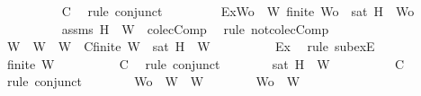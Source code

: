 \begin{isabellebody}
\ \ \ \ \ \ \ \ \isamarkupfalse%
\ C\ \isamarkupfalse%
\ {\isacharparenleft}rule\ conjunct{}{\isacharparenright}\ \isanewline
\ \ \ \ \ \ \isamarkupfalse%
\ Ex{}{\isacharcolon}{\isachardoublequoteopen}{\isasymexists}Wo\ {\isasymsubseteq}\ W{\isachardot}\ finite\ Wo\ {\isasymand}\ {\isasymnot}{\isacharparenleft}sat\ {\isacharparenleft}{\isacharbraceleft}H{\isacharbraceright}\ {\isasymunion}\ Wo{\isacharparenright}{\isacharparenright}{\isachardoublequoteclose}\isanewline
\ \ \ \ \ \ \ \ \isamarkupfalse%
\ assms\ {\isacartoucheopen}{\isacharbraceleft}H{\isacharbraceright}\ {\isasymunion}\ W\ {\isasymnotin}\ colecComp{\isacartoucheclose}\ \isamarkupfalse%
\ {\isacharparenleft}rule\ not{\isacharunderscore}colecComp{\isacharparenright}\isanewline
\ \ \ \ \ \ \isamarkupfalse%
\ W{}\ \ {\isachardoublequoteopen}W{}\ {\isasymsubseteq}\ W{\isachardoublequoteclose}\ \ C{}{\isacharcolon}{\isachardoublequoteopen}finite\ W{}\ {\isasymand}\ {\isasymnot}{\isacharparenleft}sat\ {\isacharparenleft}{\isacharbraceleft}H{\isacharbraceright}\ {\isasymunion}\ W{}{\isacharparenright}{\isacharparenright}{\isachardoublequoteclose}\isanewline
\ \ \ \ \ \ \ \ \isamarkupfalse%
\ Ex{}\ \isamarkupfalse%
\ {\isacharparenleft}rule\ subexE{\isacharparenright}\isanewline
\ \ \ \ \ \ \isamarkupfalse%
\ {\isachardoublequoteopen}finite\ W{}{\isachardoublequoteclose}\isanewline
\ \ \ \ \ \ \ \ \isamarkupfalse%
\ C{}\ \isamarkupfalse%
\ {\isacharparenleft}rule\ conjunct{}{\isacharparenright}\isanewline
\ \ \ \ \ \ \isamarkupfalse%
\ {\isachardoublequoteopen}{\isasymnot}{\isacharparenleft}sat\ {\isacharparenleft}{\isacharbraceleft}H{\isacharbraceright}\ {\isasymunion}\ W{}{\isacharparenright}{\isacharparenright}{\isachardoublequoteclose}\isanewline
\ \ \ \ \ \ \ \ \isamarkupfalse%
\ C{}\ \isamarkupfalse%
\ {\isacharparenleft}rule\ conjunct{}{\isacharparenright}\isanewline
\ \ \ \ \ \ \isamarkupfalse%
\ {\isacharquery}Wo\ {\isacharequal}\ {\isachardoublequoteopen}W{}\ {\isasymunion}\ W{}{\isachardoublequoteclose}\isanewline
\ \ \ \ \ \ \isamarkupfalse%
\ {\isachardoublequoteopen}{\isacharquery}Wo\ {\isasymsubseteq}\ W{\isachardoublequoteclose}\isanewline

\end{isabellebody}
